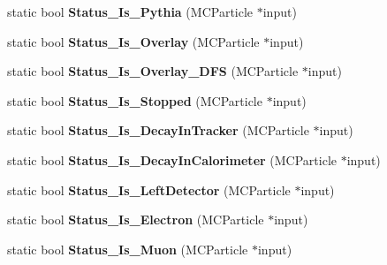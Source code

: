 \begin{DoxyCompactItemize}
\item 
\hypertarget{classToolSet_1_1CMC_a3fbb915477cbbdca4193b8b2ff8cd356}{
static bool {\bfseries Status\_\-Is\_\-Pythia} (MCParticle $\ast$input)}
\label{classToolSet_1_1CMC_a3fbb915477cbbdca4193b8b2ff8cd356}

\item 
\hypertarget{classToolSet_1_1CMC_a9d3659a1fd4bad33a54c08769902e998}{
static bool {\bfseries Status\_\-Is\_\-Overlay} (MCParticle $\ast$input)}
\label{classToolSet_1_1CMC_a9d3659a1fd4bad33a54c08769902e998}

\item 
\hypertarget{classToolSet_1_1CMC_acb83c834c9e5e1c33f8c2514e4c40d93}{
static bool {\bfseries Status\_\-Is\_\-Overlay\_\-DFS} (MCParticle $\ast$input)}
\label{classToolSet_1_1CMC_acb83c834c9e5e1c33f8c2514e4c40d93}

\item 
\hypertarget{classToolSet_1_1CMC_aac0eed5c22431cfc5e9c32d9bc48b0d7}{
static bool {\bfseries Status\_\-Is\_\-Stopped} (MCParticle $\ast$input)}
\label{classToolSet_1_1CMC_aac0eed5c22431cfc5e9c32d9bc48b0d7}

\item 
\hypertarget{classToolSet_1_1CMC_a2b903f56e1a2c0635e722a47d5e3e87f}{
static bool {\bfseries Status\_\-Is\_\-DecayInTracker} (MCParticle $\ast$input)}
\label{classToolSet_1_1CMC_a2b903f56e1a2c0635e722a47d5e3e87f}

\item 
\hypertarget{classToolSet_1_1CMC_ad59fb18ae62349bf343ad165950f776a}{
static bool {\bfseries Status\_\-Is\_\-DecayInCalorimeter} (MCParticle $\ast$input)}
\label{classToolSet_1_1CMC_ad59fb18ae62349bf343ad165950f776a}

\item 
\hypertarget{classToolSet_1_1CMC_ac893a50b848486f2ebfcdc877c148491}{
static bool {\bfseries Status\_\-Is\_\-LeftDetector} (MCParticle $\ast$input)}
\label{classToolSet_1_1CMC_ac893a50b848486f2ebfcdc877c148491}

\item 
\hypertarget{classToolSet_1_1CMC_a3d78b61ff25d63169a4bb76f2b3b1268}{
static bool {\bfseries Status\_\-Is\_\-Electron} (MCParticle $\ast$input)}
\label{classToolSet_1_1CMC_a3d78b61ff25d63169a4bb76f2b3b1268}

\item 
\hypertarget{classToolSet_1_1CMC_aa3543a71f0c9b7822dc45df8d7820e1b}{
static bool {\bfseries Status\_\-Is\_\-Muon} (MCParticle $\ast$input)}
\label{classToolSet_1_1CMC_aa3543a71f0c9b7822dc45df8d7820e1b}


\end{DoxyCompactItemize}
